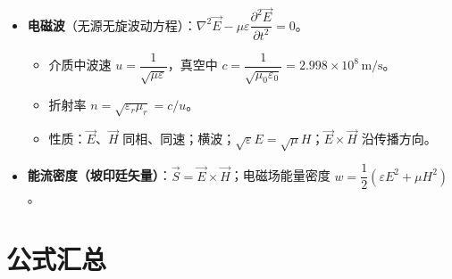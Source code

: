 \documentclass[12pt,a4paper]{ctexart}
\begin{document}
\begin{itemize}
\begin{itemize}
        \item 相同：都激发磁场。
        \item 不同：本质不同（位移电流为变化电场）；传导电流有热效应，位移电流无热效应；位移电流可在真空中。
    \end{itemize}
    \item \textbf{电磁波}（无源无旋波动方程）：$\nabla^2\vec E-\mu\varepsilon\dfrac{\partial^2\vec E}{\partial t^2}=0$。
    \begin{itemize}
        \item 介质中波速 $u=\dfrac{1}{\sqrt{\mu\varepsilon}}$，真空中 $c=\dfrac{1}{\sqrt{\mu_0\varepsilon_0}}=2.998\times10^8\,\text{m/s}$。
        \item 折射率 $n=\sqrt{\varepsilon_r\mu_r}=c/u$。
        \item 性质：$\vec E$、$\vec H$ 同相、同速；横波；$\sqrt{\varepsilon}E=\sqrt{\mu}H$；$\vec E\times\vec H$ 沿传播方向。
    \end{itemize}
    \item \textbf{能流密度（坡印廷矢量）}：$\vec S=\vec E\times\vec H$；电磁场能量密度 $w=\dfrac{1}{2}(\varepsilon E^2+\mu H^2)$。
\end{itemize}

\section{公式汇总}
\end{document}

